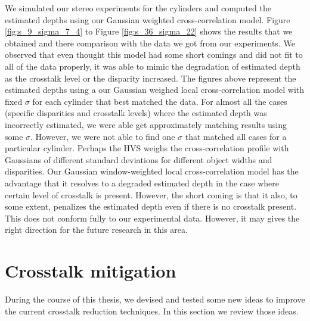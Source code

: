 We simulated our stereo experiments for the cylinders and computed the estimated depths using our Gaussian weighted cross-correlation model. Figure \ref{fig:s_9_sigma_7_4} to Figure \ref{fig:s_36_sigma_22} shows the results that we obtained and there comparison with the data we got from our experiments. We observed that even thought this model had some short comings and did not fit to all of the data properly, it was able to mimic the degradation of estimated depth as the crosstalk level or the disparity increased. The figures above represent the estimated depths using a our Gaussian weighed local cross-correlation model with fixed $\sigma$ for each cylinder that best matched the data. For almost all the cases (specific disparities and crosstalk levels) where the estimated depth was incorrectly estimated, we were able get approximately matching results using some $\sigma$. However, we were not able to find one $\sigma$ that matched all cases for a particular cylinder. Perhaps the HVS weighs the cross-correlation profile with Gaussians of different standard deviations for different object widths and disparities. Our Gaussian window-weighted local cross-correlation model has the advantage that it resolves to a degraded estimated depth in the case where certain level of crosstalk is present. However, the short coming is that it also, to some extent, penalizes the estimated depth even if there is no crosstalk present. This does not conform fully to our experimental data. However, it may gives the right direction for the future research in this area.
\pagebreak

\section{Crosstalk mitigation}

During the course of this thesis, we devised and tested some new ideas to improve the current crosstalk reduction techniques. In this section we review those ideas.

